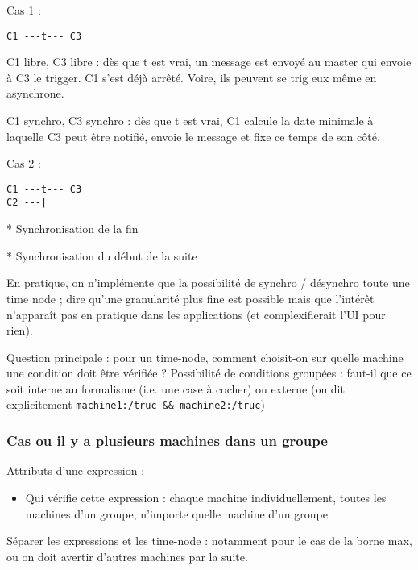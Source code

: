 \documentclass{article}
\begin{document}
Cas 1 : 
\begin{lstlisting}
C1 ---t--- C3
\end{lstlisting}
C1 libre, C3 libre : dès que t est vrai, un message est envoyé au master qui envoie à C3 le trigger. C1 s'est déjà arrêté.
Voire, ils peuvent se trig eux même en asynchrone.

C1 synchro, C3 synchro : dès que t est vrai, C1 calcule la date minimale à laquelle C3 peut être notifié, envoie le message et fixe ce temps de son côté.

Cas 2 : 
\begin{lstlisting}
C1 ---t--- C3
C2 ---|
\end{lstlisting}

* Synchronisation de la fin

* Synchronisation du début de la suite

En pratique, on n'implémente que la possibilité de synchro / désynchro toute une time node ; dire qu'une granularité plus fine est possible mais que l'intérêt n'apparaît pas en pratique dans les applications (et complexifierait l'UI pour rien).

Question principale : pour un time-node, comment choisit-on sur quelle machine une condition doit être vérifiée ? Possibilité de conditions groupées : faut-il que ce soit interne au formalisme (i.e. une case à cocher) ou externe (on dit explicitement \lstinline|machine1:/truc && machine2:/truc|)

\subsubsection{Cas ou il y a plusieurs machines dans un groupe}
Attributs d'une expression : 
\begin{itemize}
    \item Qui vérifie cette expression : chaque machine individuellement, toutes les machines d'un groupe, n'importe quelle machine d'un groupe 
\end{itemize}

Séparer les expressions et les time-node : notamment pour le cas de la borne max, ou on doit avertir d'autres machines par la suite.
\end{document}
